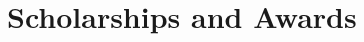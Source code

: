 \documentclass[11pt,a4paper,sans]{moderncv}        %
\begin{document}




 
 
 

\section{Scholarships and Awards}

\end{document}
